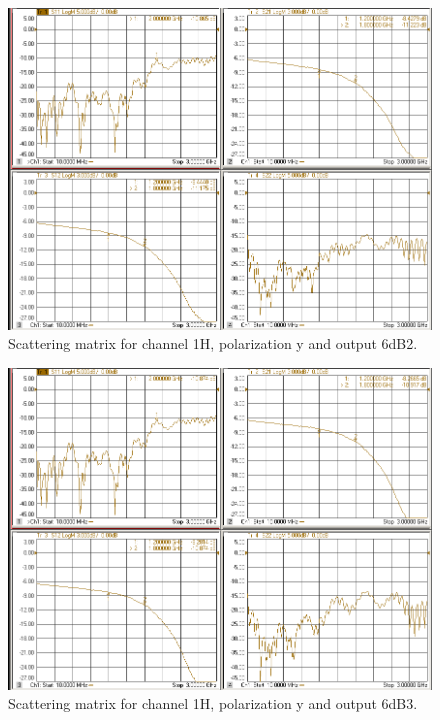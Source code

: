 \documentclass[12pt,a4paper,oneside]{article}
\begin{document}
\begin{figure}[H]
\centering
\includegraphics[width=0.9\linewidth]{VNA_results/1Hy_6dB2.png}
\caption{Scattering matrix for channel 1H, polarization y and output 6dB2.}
\label{fig:1Hy_6dB2}
\end{figure}


\begin{figure}[H]
\centering
\includegraphics[width=0.9\linewidth]{VNA_results/1Hy_6dB3.png}
\caption{Scattering matrix for channel 1H, polarization y and output 6dB3.}
\label{fig:1Hy_6dB3}
\end{figure}
\end{document}
